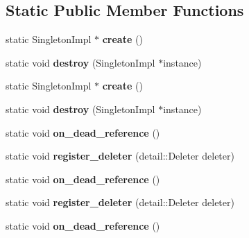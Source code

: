 \subsection*{Static Public Member Functions}
\begin{CompactItemize}
\item 
\hypertarget{classhope_1_1final_13b450c504d01d7bfc33fc4692d0fa80}{
static SingletonImpl $\ast$ \textbf{create} ()}
\label{classhope_1_1final_13b450c504d01d7bfc33fc4692d0fa80}

\item 
\hypertarget{classhope_1_1final_5b08245700881f722aee4811b62e6aec}{
static void \textbf{destroy} (SingletonImpl $\ast$instance)}
\label{classhope_1_1final_5b08245700881f722aee4811b62e6aec}

\item 
\hypertarget{classhope_1_1final_13b450c504d01d7bfc33fc4692d0fa80}{
static SingletonImpl $\ast$ \textbf{create} ()}
\label{classhope_1_1final_13b450c504d01d7bfc33fc4692d0fa80}

\item 
\hypertarget{classhope_1_1final_5b08245700881f722aee4811b62e6aec}{
static void \textbf{destroy} (SingletonImpl $\ast$instance)}
\label{classhope_1_1final_5b08245700881f722aee4811b62e6aec}

\item 
\hypertarget{classhope_1_1final_268efe68664b71ead7fb1bcf838bb51f}{
static void \textbf{on\_\-dead\_\-reference} ()}
\label{classhope_1_1final_268efe68664b71ead7fb1bcf838bb51f}

\item 
\hypertarget{classhope_1_1final_00be6ae22eb41e3315e169c26a19e5cf}{
static void \textbf{register\_\-deleter} (detail::Deleter deleter)}
\label{classhope_1_1final_00be6ae22eb41e3315e169c26a19e5cf}

\item 
\hypertarget{classhope_1_1final_268efe68664b71ead7fb1bcf838bb51f}{
static void \textbf{on\_\-dead\_\-reference} ()}
\label{classhope_1_1final_268efe68664b71ead7fb1bcf838bb51f}

\item 
\hypertarget{classhope_1_1final_00be6ae22eb41e3315e169c26a19e5cf}{
static void \textbf{register\_\-deleter} (detail::Deleter deleter)}
\label{classhope_1_1final_00be6ae22eb41e3315e169c26a19e5cf}

\item 
\hypertarget{classhope_1_1final_268efe68664b71ead7fb1bcf838bb51f}{
static void \textbf{on\_\-dead\_\-reference} ()}
\label{classhope_1_1final_268efe68664b71ead7fb1bcf838bb51f}


\end{CompactItemize}
